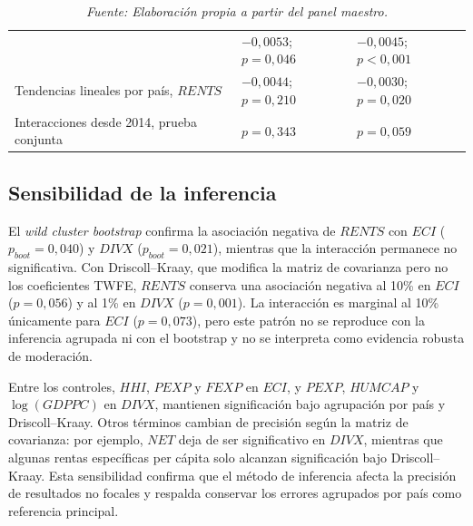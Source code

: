 \documentclass[../../TFM.tex]{subfiles}
\begin{document}
\begin{table}[htbp]
{\begin{tabular}{p{}p{}p{}}
        & $-0,0053$; $p=0,046$ & $-0,0045$; $p<0,001$ \\
        Tendencias lineales por país, $RENTS$
        & $-0,0044$; $p=0,210$ & $-0,0030$; $p=0,020$ \\
        Interacciones desde 2014, prueba conjunta
        & $p=0,343$ & $p=0,059$ \\
        \bottomrule
    \end{tabular}}
    \caption*{\footnotesize \textit{Nota:} El bootstrap utiliza 9.999 replicaciones y pesos Rademacher. Driscoll--Kraay emplea dos rezagos. Las primeras diferencias y los modelos dinámicos utilizan 869 observaciones, 49 países y 19 años efectivos; sus coeficientes no tienen el mismo estimando que TWFE en niveles. La sensibilidad de 2014 se estima en la muestra completa y contrasta conjuntamente los cambios de $RENTS$, $INST$ y $RENTS\times INST$.}
    \caption*{\footnotesize \textit{Fuente: Elaboración propia a partir del panel maestro.}}
\end{table}

\subsection{Sensibilidad de la inferencia}
\label{subsec:resultados-inferencia-alternativa}

El \textit{wild cluster bootstrap} confirma la asociación negativa de $RENTS$
con $ECI$ ($p_{boot}=0,040$) y $DIVX$ ($p_{boot}=0,021$), mientras que la
interacción permanece no significativa. Con Driscoll--Kraay, que modifica la
matriz de covarianza pero no los coeficientes TWFE, $RENTS$ conserva una
asociación negativa al 10\% en $ECI$ ($p=0,056$) y al 1\% en $DIVX$
($p=0,001$). La interacción es marginal al 10\% únicamente para $ECI$
($p=0,073$), pero este patrón no se reproduce con la inferencia agrupada ni con
el bootstrap y no se interpreta como evidencia robusta de moderación.

Entre los controles, $HHI$, $PEXP$ y $FEXP$ en $ECI$, y $PEXP$, $HUMCAP$ y
$\log(GDPPC)$ en $DIVX$, mantienen significación bajo agrupación por país y
Driscoll--Kraay. Otros términos cambian de precisión según la matriz de
covarianza: por ejemplo, $NET$ deja de ser significativo en $DIVX$, mientras
que algunas rentas específicas per cápita solo alcanzan significación bajo
Driscoll--Kraay. Esta sensibilidad confirma que el método de inferencia afecta
la precisión de resultados no focales y respalda conservar los errores agrupados
por país como referencia principal.
\end{document}
